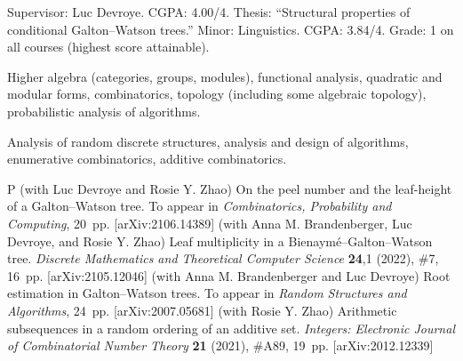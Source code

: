 \smallskip




\smallskip
Supervisor: Luc Devroye. CGPA: 4.00/4.
Thesis: ``Structural properties of conditional Galton--Watson trees.''
\medbreak
{}
\smallskip
Minor: Linguistics. CGPA: 3.84/4.
\medbreak
{}
\smallskip
Grade: 1 on all courses (highest score attainable).


\smallskip
{}
\smallskip
{}


Higher algebra (categories, groups, modules), functional analysis, quadratic and modular forms, combinatorics,
topology (including some algebraic topology), probabilistic analysis of algorithms.


Analysis of random discrete structures, analysis and design of algorithms, enumerative combinatorics,
additive combinatorics.


\begingroup\frenchspacing
{}
\pubbegin P
\papitem (with Luc Devroye and Rosie Y. Zhao)
On the peel number and the leaf-height of a Galton--Watson tree.
To appear in {\sl Combinatorics, Probability and Computing}, 20~pp. [arXiv:2106.14389]
\papitem (with Anna M. Brandenberger, Luc Devroye, and Rosie Y. Zhao)
Leaf multiplicity in a Bienaym\'e--Galton--Watson tree. {\sl Discrete Mathematics
and Theoretical Computer Science} {\bf 24},1 (2022), \#7, 16~pp. [arXiv:2105.12046]
\papitem (with Anna M. Brandenberger and Luc Devroye)
Root estimation in Galton--Watson trees. To appear in {\sl Random Structures and Algorithms}, 24~pp.
[arXiv:2007.05681]
\papitem (with Rosie Y. Zhao)
Arithmetic subsequences in a random ordering of an additive set.
{\sl Integers: Electronic Journal of Combinatorial Number Theory} {\bf 21} (2021), \#A89, 19~pp.
[arXiv:2012.12339]

